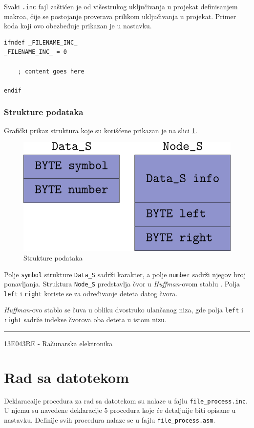 \documentclass[a4paper, 12pt]{article}
\newcommand{\btmline}{
\vfill
\rule{0.9\textwidth}{0.4mm}
\begin{center}
13E043RE - Računarska elektronika
\end{center}}
\newcommand{\Huff}{\emph{Huffman}}
\begin{document}
Svaki \verb|.inc| fajl zaštićen je od višestrukog uključivanja u projekat definisanjem makroa, čije se postojanje proverava prilikom uključivanja u projekat.
Primer koda koji ovo obezbeđuje prikazan je u nastavku.

\begin{verbatim}
ifndef _FILENAME_INC_
_FILENAME_INC_ = 0

	; content goes here
	
endif
\end{verbatim}

\subsubsection*{Strukture podataka}

Grafički prikaz struktura koje su korišćene prikazan je na slici \ref{struct}. 

\begin{figure}[h!]
\centering
\includegraphics[width=.5\textwidth]{structures}
\caption{Strukture podataka}
\label{struct}
\end{figure}

Polje \verb|symbol| strukture \verb|Data_S| sadrži karakter, a polje \verb|number| sadrži njegov broj ponavljanja.
Struktura \verb|Node_S| predstavlja čvor u \textit{Huffman}-ovom stablu . Polja \verb|left| i \verb|right| koriste se 
za određivanje deteta datog čvora. 

\Huff-ovo stablo se čuva u obliku dvostruko ulančanog niza, gde polja \verb|left| i \verb|right| sadrže indekse čvorova oba deteta u istom nizu.

\btmline\newpage

\section*{Rad sa datotekom}

Deklaracaije procedura za rad sa datotekom su nalaze u fajlu \verb|file_process.inc|. U njemu su navedene deklaracije 5 procedura koje će detaljnije biti opisane u nastavku. Definije svih procedura nalaze se u fajlu \verb|file_process.asm|.
\end{document}
